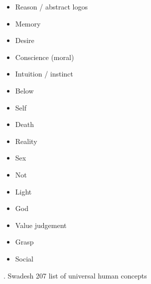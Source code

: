 \begin{itemize}
\item   Reason / abstract logos  

\item   Memory 

\item   Desire 

\item   Conscience (moral) 

\item   Intuition / instinct 

\item   Below 

\item   Self 

\item   Death 

\item   Reality 

\item   Sex 

\item   Not 

\item   Light 

\item   God 

\item   Value judgement  

\item   Grasp 

\item   Social  
\end{itemize}

. Swadesh 207 list of universal human concepts 

